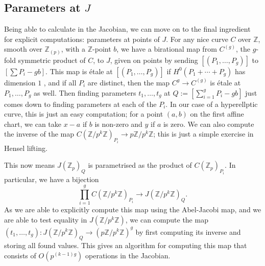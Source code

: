 \documentclass[12pt]{article}
\newcommand{\Z}{\mathbb{Z}}
\theoremstyle{plain}
\theoremstyle{definition}
\theoremstyle{remark}
\begin{document}
\subsection{Parameters at $J$}
\label{subs:paramj}
Being able to calculate in the Jacobian, we can move on to the final ingredient for explicit computations: parameters at points of $J$. For any nice curve $C$ over $\Z$, smooth over $\Z_{(p)}$, with a $\Z$-point $b$, we have a birational map from $C^{(g)}$, the $g$-fold symmetric product of $C$, to $J$, given on points by sending $[(P_1,\dots,P_g)]$ to $[\sum P_i - gb]$. This map is \'etale at $[(P_1,\dots,P_g)]$ if $H^0(P_1 + \cdots + P_g)$ has dimension $1$ , and if all $P_i$ are distinct, then the map $C^g \to C^{(g)}$ is \'etale at $P_1,\dots,P_g$ as well. Then finding parameters $t_1,\dots,t_g$ at $Q := [\sum_{i=1}^g P_i - gb]$ just comes down to finding parameters at each of the $P_i$. In our case of a hyperellptic curve, this is just an easy computation; for a point $(a,b)$ on the first affine chart, we can take $x-a$ if $b$ is non-zero and $y$ if $a$ is zero. We can also compute the inverse of the map $C(\Z/p^k\Z)_{P_i} \to p\Z/p^k\Z$; this is just a simple exercise in Hensel lifting.

This now means $J(\Z_p)_Q$ is parametrised as the product of $C(\Z_p)_{P_i}$. In particular, we have a bijection
\[
\prod_{i=1}^g C(\Z/p^k\Z)_{P_i} \to J(\Z/p^k\Z)_{Q}.
\] As we are able to explicitly compute this map using the Abel-Jacobi map, and we are able to test equality in $J(\Z/p^k\Z)$, we can compute the map $(t_1,\dots,t_g): J(\Z/p^k\Z)_Q \to (p\Z/p^{k}\Z)^g$ by first computing its inverse and storing all found values. This gives an algorithm for computing this map that consists of $O(p^{(k-1)g})$ operations in the Jacobian.

\end{document}
